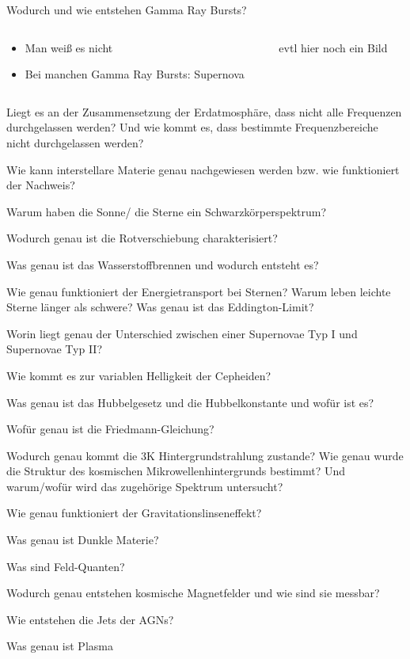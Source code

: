 \begin{frame}{Wodurch und wie entstehen Gamma Ray Bursts?}
  \begin{columns}
 \begin{column}{0.4\textwidth}
  \begin{itemize}
    \item  Man weiß es nicht
    \item  Bei manchen Gamma Ray Bursts: Supernova
  \end{itemize}
\vspace{2em}
\end{column}
\begin{column}{0.6\textwidth}
  evtl hier noch ein Bild
\end{column}
  \end{columns}
\end{frame}

\begin{frame}


Liegt es an der Zusammensetzung der Erdatmosphäre, dass nicht alle Frequenzen durchgelassen werden? Und wie kommt es, dass bestimmte Frequenzbereiche nicht durchgelassen werden?

Wie kann interstellare Materie genau nachgewiesen werden bzw. wie funktioniert der Nachweis?

Warum haben die Sonne/ die Sterne ein Schwarzkörperspektrum?

Wodurch genau ist die Rotverschiebung charakterisiert?

Was genau ist das Wasserstoffbrennen und wodurch entsteht es?

Wie genau funktioniert der Energietransport bei Sternen? Warum leben leichte Sterne länger als schwere? Was genau ist das Eddington-Limit?

Worin liegt genau der Unterschied zwischen einer Supernovae Typ I und Supernovae Typ II?

Wie kommt es zur variablen Helligkeit der Cepheiden?

Was genau ist das Hubbelgesetz und die Hubbelkonstante und wofür ist es?

Wofür genau ist die Friedmann-Gleichung?

Wodurch genau kommt die 3K Hintergrundstrahlung zustande? Wie genau wurde die Struktur des kosmischen Mikrowellenhintergrunds bestimmt? Und warum/wofür wird das zugehörige Spektrum untersucht?

Wie genau funktioniert der Gravitationslinseneffekt?

Was genau ist Dunkle Materie?

Was sind Feld-Quanten?

Wodurch genau entstehen kosmische Magnetfelder und wie sind sie messbar?

Wie entstehen die Jets der AGNs?

Was genau ist Plasma

\end{frame}
